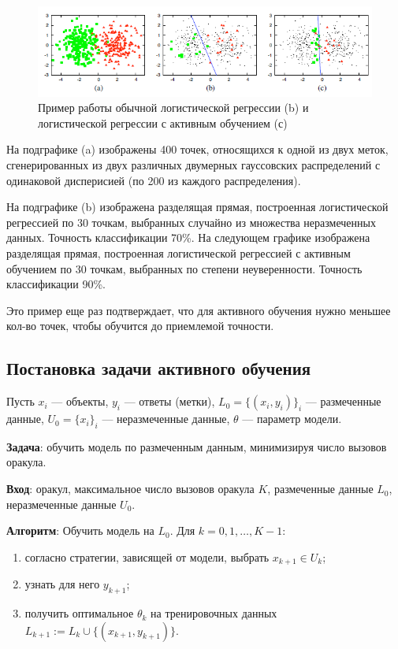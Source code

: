 \documentclass[specialist, 12pt, href]{article}
\begin{document}
\begin{figure}[htbp]
\centering
\includegraphics[width=6in]{img/example.png}
\caption{Пример работы обычной логистической регрессии (b) и
логистической регрессии с активным обучением (с)}
\end{figure}

На подграфике (a) изображены 400 точек, относящихся к одной из двух
меток, сгенерированных из двух различных двумерных гауссовских
распределений с одинаковой дисперисией (по 200 из каждого
распределения).

На подграфике (b) изображена разделящая прямая, построенная
логистической регрессией по 30 точкам, выбранных случайно из множества неразмеченных
данных. Точность классификации 70\%. На следующем графике изображена
разделящая прямая, построенная логистической регрессией с активным
обучением по 30 точкам, выбранных по степени неуверенности. Точность
классификации 90\%.

Это пример еще раз подтверждает, что для активного обучения нужно
меньшее кол-во точек, чтобы обучится до приемлемой точности.

\subsection{Постановка задачи активного
обучения}

Пусть 
\(x_i\) --- объекты, \(y_i\) --- ответы (метки),  \(L_0 = \{(x_i, y_i)\}_i\) --- размеченные данные, \(U_0 = \{x_i\}_i\) --- неразмеченные данные, ${\theta}$ --- параметр модели.

\textbf{Задача}: обучить модель по размеченным данным, минимизируя число вызовов оракула.

\textbf{Вход}: оракул, максимальное число вызовов
оракула \(K\), размеченные данные \(L_0\), неразмеченные данные \(U_0\).

\textbf{Алгоритм}: Обучить модель на \(L_0\). Для
\(k = 0, 1, \ldots, K - 1\):
\begin{enumerate}
\item
согласно стратегии, зависящей от модели, выбрать \(x_{k + 1} \in U_k\);
\item
узнать
для него \(y_{k + 1}\);
\item
получить оптимальное \(\theta_k\) на
тренировочных данных
\(L_{k + 1} := L_{k} \cup \{(x_{k + 1}, y_{k + 1})\}\).
\end{enumerate}
\end{document}
